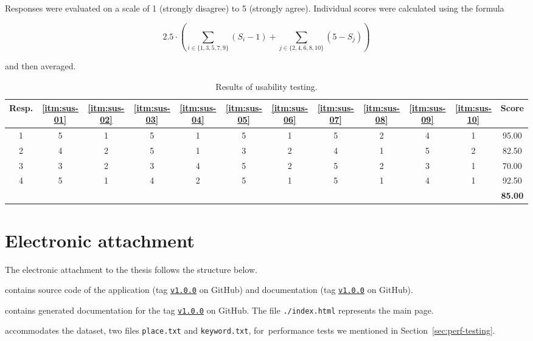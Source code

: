 Responses were evaluated on a scale of 1 (strongly disagree) to 5 (strongly agree). Individual scores were calculated using the formula

\begin{equation*}
2.5 \cdot \left( \sum_{i \in \{ 1, 3, 5, 7, 9 \}} \left( S_{i} - 1 \right) + \sum_{j \in \{ 2, 4, 6, 8, 10 \}} \left( 5 - S_{j} \right) \right)
\end{equation*}

and then averaged.

\bgroup
\def\arraystretch{1.2}
\begin{table}[!h]
\centering\footnotesize
\begin{tabular}{ c c c c c c c c c c c c }
\toprule
\textbf{Resp.}
  & \ref{itm:sus-01}
    & \ref{itm:sus-02}
      & \ref{itm:sus-03}
        & \ref{itm:sus-04}
          & \ref{itm:sus-05}
            & \ref{itm:sus-06}
              & \ref{itm:sus-07}
                & \ref{itm:sus-08}
                  & \ref{itm:sus-09}
                    & \ref{itm:sus-10}
                      & \textbf{Score} \\
\midrule
1 & 5 & 1 & 5 & 1 & 5 & 1 & 5 & 2 & 4 & 1 & 95.00           \\
2 & 4 & 2 & 5 & 1 & 3 & 2 & 4 & 1 & 5 & 2 & 82.50           \\
3 & 3 & 2 & 3 & 4 & 5 & 2 & 5 & 2 & 3 & 1 & 70.00           \\
4 & 5 & 1 & 4 & 2 & 5 & 1 & 5 & 1 & 4 & 1 & 92.50           \\
\midrule
  &   &   &   &   &   &   &   &   &   &   & \textbf{85.00}  \\
\toprule
\end{tabular}
\caption{Results of usability testing.}
\label{tab:results-usability-testing}
\end{table}
\egroup

\section{Electronic attachment}\label{sec:electronic-attachment}

The electronic attachment to the thesis follows the structure below.

\begin{description}[font=\tt]
\item[code/] contains source code of the application (tag \href{https://github.com/zhukovdm/smartwalk/releases/tag/v1.0.0}{\texttt{v1.0.0}} on GitHub) and doc\-u\-men\-ta\-tion (tag \href{https://github.com/zhukovdm/smartwalk-docs/releases/tag/v1.0.0}{\texttt{v1.0.0}} on GitHub).
\item[docs/] contains generated documentation for the tag \href{https://github.com/zhukovdm/smartwalk-docs/releases/tag/v1.0.0}{\texttt{v1.0.0}} on GitHub. The file \texttt{./index.html} represents the main page.
\item[perf/] accommodates the dataset, two files \texttt{place.txt} and \texttt{keyword.txt}, for~per\-for\-mance tests we mentioned in Section~\ref{sec:perf-testing}.
\end{description}


